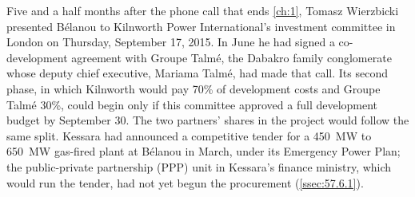 Five and a half months after the phone call that ends \cref{ch:1}, Tomasz Wierzbicki presented Bélanou to Kilnworth Power International's investment committee in London on Thursday, September 17, 2015. In June he had signed a co-development agreement with Groupe Talmé, the Dabakro family conglomerate whose deputy chief executive, Mariama Talmé, had made that call. Its second phase, in which Kilnworth would pay 70\% of development costs and Groupe Talmé 30\%, could begin only if this committee approved a full development budget by September 30. The two partners' shares in the project would follow the same split. Kessara had announced a competitive tender for a 450~MW to 650~MW gas-fired plant at Bélanou in March, under its Emergency Power Plan; the public-private partnership (PPP) unit in Kessara's finance ministry, which would run the tender, had not yet begun the procurement (\cref{ssec:57.6.1}).

